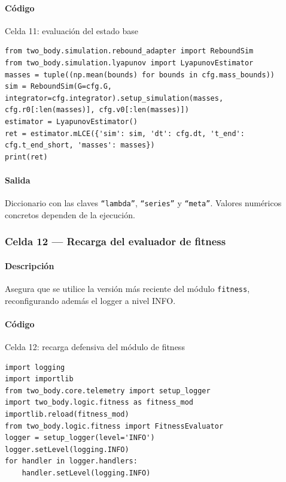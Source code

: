 \paragraph{Código}
\begin{listing}[H]
\caption{Celda 11: evaluación del estado base}
\begin{adjustbox}{max width=\textwidth}
\begin{minipage}{\textwidth}
\begin{verbatim}
from two_body.simulation.rebound_adapter import ReboundSim
from two_body.simulation.lyapunov import LyapunovEstimator
masses = tuple((np.mean(bounds) for bounds in cfg.mass_bounds))
sim = ReboundSim(G=cfg.G, integrator=cfg.integrator).setup_simulation(masses, cfg.r0[:len(masses)], cfg.v0[:len(masses)])
estimator = LyapunovEstimator()
ret = estimator.mLCE({'sim': sim, 'dt': cfg.dt, 't_end': cfg.t_end_short, 'masses': masses})
print(ret)
\end{verbatim}
\end{minipage}
\end{adjustbox}
\end{listing}
\paragraph{Salida} Diccionario con las claves \texttt{``lambda''}, \texttt{``series''} y \texttt{``meta''}. Valores numéricos concretos dependen de la ejecución.

\subsubsection*{Celda 12 — Recarga del evaluador de fitness}
\paragraph{Descripción} Asegura que se utilice la versión más reciente del módulo \texttt{fitness}, reconfigurando además el logger a nivel INFO.\
\paragraph{Código}
\begin{listing}[H]
\caption{Celda 12: recarga defensiva del módulo de fitness}
\begin{adjustbox}{max width=\textwidth}
\begin{minipage}{\textwidth}
\begin{verbatim}
import logging
import importlib
from two_body.core.telemetry import setup_logger
import two_body.logic.fitness as fitness_mod
importlib.reload(fitness_mod)
from two_body.logic.fitness import FitnessEvaluator
logger = setup_logger(level='INFO')
logger.setLevel(logging.INFO)
for handler in logger.handlers:
    handler.setLevel(logging.INFO)
\end{verbatim}
\end{minipage}
\end{adjustbox}
\end{listing}
